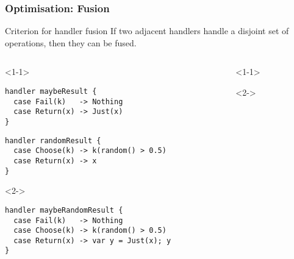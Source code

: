 \documentclass[10pt,compress]{beamer}
\begin{document}
\begin{frame}[fragile]
  \frametitle{Optimisation: Fusion}
  \begin{block}{Criterion for handler fusion}
    If two adjacent handlers handle a disjoint set of operations, then they can be fused.
  \end{block}
\vfill
\begin{columns}
\begin{column}{0.6\textwidth}
\begin{onlyenv}<1-1>
\begin{lstlisting}
handler maybeResult {
  case Fail(k)   -> Nothing
  case Return(x) -> Just(x)
}
\end{lstlisting}

\begin{lstlisting}
handler randomResult {
  case Choose(k) -> k(random() > 0.5)
  case Return(x) -> x
}
\end{lstlisting}
\end{onlyenv}
\begin{onlyenv}<2->
\begin{lstlisting}
handler maybeRandomResult {
  case Fail(k)   -> Nothing
  case Choose(k) -> k(random() > 0.5)
  case Return(x) -> var y = Just(x); y
}
\end{lstlisting}
\end{onlyenv}
\end{column}
\begin{column}{0.4\textwidth}
\begin{onlyenv}<1-1>
\end{onlyenv}
\begin{onlyenv}<2->
\end{onlyenv}
\end{column}
\end{columns}
\end{frame}
\end{document}
